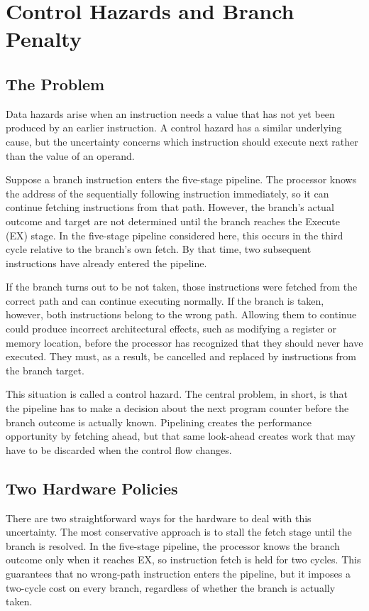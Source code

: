 \documentclass[12pt,a4paper]{report}
\begin{document}
\section{Control Hazards and Branch Penalty}
\label{sec:control-hazards}

\subsection{The Problem}

Data hazards arise when an instruction needs a value that has not yet been produced by an earlier instruction. A control hazard has a similar underlying cause, but the uncertainty concerns which instruction should execute next rather than the value of an operand.

Suppose a branch instruction enters the five-stage pipeline. The processor knows the address of the sequentially following instruction immediately, so it can continue fetching instructions from that path. However, the branch's actual outcome and target are not determined until the branch reaches the Execute (EX) stage. In the five-stage pipeline considered here, this occurs in the third cycle relative to the branch's own fetch. By that time, two subsequent instructions have already entered the pipeline.

If the branch turns out to be not taken, those instructions were fetched from the correct path and can continue executing normally. If the branch is taken, however, both instructions belong to the wrong path. Allowing them to continue could produce incorrect architectural effects, such as modifying a register or memory location, before the processor has recognized that they should never have executed. They must, as a result, be cancelled and replaced by instructions from the branch target.

This situation is called a control hazard. The central problem, in short, is that the pipeline has to make a decision about the next program counter before the branch outcome is actually known. Pipelining creates the performance opportunity by fetching ahead, but that same look-ahead creates work that may have to be discarded when the control flow changes.~\cite{sarangi}

\subsection{Two Hardware Policies}

There are two straightforward ways for the hardware to deal with this uncertainty. The most conservative approach is to stall the fetch stage until the branch is resolved. In the five-stage pipeline, the processor knows the branch outcome only when it reaches EX, so instruction fetch is held for two cycles. This guarantees that no wrong-path instruction enters the pipeline, but it imposes a two-cycle cost on every branch, regardless of whether the branch is actually taken.
\end{document}
